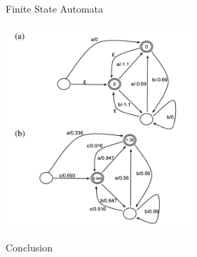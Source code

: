 \documentclass{beamer}
\begin{document}
\begin{frame}{Finite State Automata}
  \begin{center}
    \includegraphics[width=7cm]{fsa}
  \end{center}
\end{frame}


\begin{frame}{Conclusion}
  
\end{frame}
\end{document}
